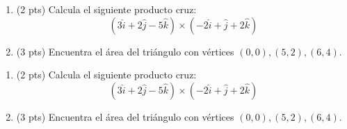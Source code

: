 \documentclass[12pt]{article}
\begin{document}
\bigskip

            
\bigskip
\bigskip
\bigskip


\begin{enumerate}

\item (2 pts) Calcula el siguiente producto cruz:
  $$(3\hat{i}+2\hat{j}-5\hat{k})\times (-2\hat{i}+\hat{j}+2\hat{k})$$

\vspace{3.5cm}
  
  \item (3 pts) Encuentra el \'area del tri\'angulo con v\'ertices $(0,0), (5,2), (6,4)$.

  \end{enumerate}


  \vspace{3cm}

  
\bigskip

            
\bigskip
\bigskip
\bigskip


\begin{enumerate}

\item (2 pts) Calcula el siguiente producto cruz:
  $$(3\hat{i}+2\hat{j}-5\hat{k})\times (-2\hat{i}+\hat{j}+2\hat{k})$$

\vspace{3.5cm}
  
  \item (3 pts) Encuentra el \'area del tri\'angulo con v\'ertices $(0,0), (5,2), (6,4)$.

\end{enumerate}
  
\end{document}
